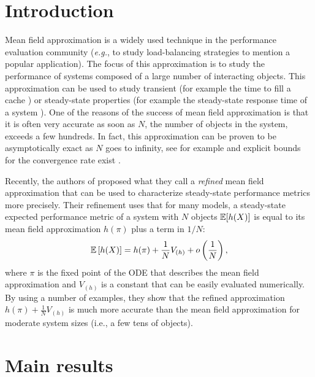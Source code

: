 \documentclass{sig-alternate-per-Performance2018}
\newcommand\esp[1]{{\mathchoice{\besp{#1}}{\sesp{#1}}{\sesp{#1}}{\sesp{#1}}}}
\newcommand\besp[1]{\mathbb{E}\left[#1\right]}
\newcommand\sesp[1]{\mathbb{E}[#1]}
\newcommand\p[1]{\left(#1\right)}
\begin{document}
\section{Introduction}

Mean field approximation is a widely used technique in the performance
evaluation community (\emph{e.g.}, to study load-balancing strategies
\cite{mitzenmacher1996power,vvedenskaya1996queueing} to mention a
popular application). The focus of this approximation is to study the
performance of systems composed of a large number of interacting
objects.  This approximation can be used to study transient (for
example the time to fill a cache \cite{gast2015transient_short}) or
steady-state properties (for example the steady-state response time of
a system \cite{mitzenmacher1996power,vvedenskaya1996queueing}).  One
of the reasons of the success of mean field approximation is that it
is often very accurate as soon as $N$, the number of objects in the
system, exceeds a few hundreds. In fact, this approximation can be
proven to be asymptotically exact as $N$ goes to infinity, see for
example \cite{kurtz70,benaim2008class} and explicit bounds for the
convergence rate exist
\cite{bortolussi2013bounds,gast2017expected,ying2016rate}.

Recently, the authors of \cite{gast2017refined} proposed what they
call a \emph{refined} mean field approximation that can be used to
characterize steady-state performance metrics more precisely. Their
refinement uses that for many models, a steady-state expected
performance metric of a system with $N$ objects $\esp{h(X)}$ is equal
to its mean field approximation $h(\pi)$ plus a term in $1/N$:
\begin{align}
  \label{eq:refined_1/N}
  \esp{h(X)} = h(\pi) + \frac1NV_{(h)} + o\p{\frac1N},
\end{align}
where $\pi$ is the fixed point of the ODE that describes the mean
field approximation and $V_{(h)}$ is a constant that can be easily
evaluated numerically.  By using a number of examples, they show that
the refined approximation $h(\pi) + \frac1NV_{(h)}$ is much more
accurate than the mean field approximation for moderate system sizes
(i.e., a few tens of objects).

\section{Main results}
\end{document}
